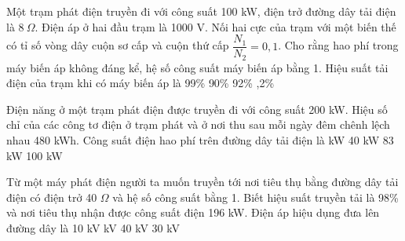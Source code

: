 \begin{vidu} %
	Một trạm phát điện truyền đi với công suất 100 kW, điện trở đường dây tải điện là $8\ \Omega $. Điện áp ở hai đầu trạm là 1000 V. Nối hai cực của trạm với một biến thế có tỉ số vòng dây cuộn sơ cấp và cuộn thứ cấp $\dfrac{N_1}{N_2}=0,1$. Cho rằng hao phí trong máy biến áp không đáng kể, hệ số công suất máy biến áp bằng 1. Hiệu suất tải điện của trạm khi có máy biến áp là
	\choice
	{99\%}
	{90\%}
	{92\%}
	{,2\%}
\end{vidu}
\begin{vidu} %
	Điện năng ở một trạm phát điện được truyền đi với công suất 200 kW. Hiệu số chỉ của các công tơ điện ở trạm phát và ở nơi thu sau mỗi ngày đêm chênh lệch nhau 480 kWh. Công suất điện hao phí trên đường dây tải điện là
	\choice
	{ kW}
	{40 kW}
	{83 kW}
	{100 kW}
\end{vidu}
\begin{vidu} %
	Từ một máy phát điện người ta muốn truyền tới nơi tiêu thụ bằng đường dây tải điện có điện trở 40 $\Omega$ và hệ số công suất bằng 1. Biết hiệu suất truyền tải là 98\% và nơi tiêu thụ nhận được công suất điện 196 kW. Điện áp hiệu dụng đưa lên đường dây là
	\choice
	{10 kV}
	{ kV}
	{40 kV}
	{30 kV}
\end{vidu}
